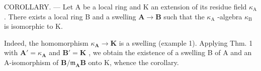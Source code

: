 COROLLARY. --- Let A be a local ring and K an extension of its residue field \(\kappa_{\mathrm{A}}\). There exists a local ring B and a swelling \(\mathbf{A} \to \mathbf{B}\) such that the \(\kappa_{\mathrm{A}}\) -algebra \(\kappa_{\mathrm{B}}\) is isomorphic to K.

Indeed, the homomorphism \(\kappa_{\mathbf{A}} \to \mathbf{K}\) is a swelling (example 1). Applying Thm. 1 with \(\mathbf{A}' = \kappa_{\mathbf{A}}\) and \(\mathbf{B}' = \mathbf{K}\) , we obtain the existence of a swelling B of A and an A-isomorphism of \(\mathbf{B} / \mathfrak{m}_{\mathbf{A}}\mathbf{B}\) onto K, whence the corollary.

